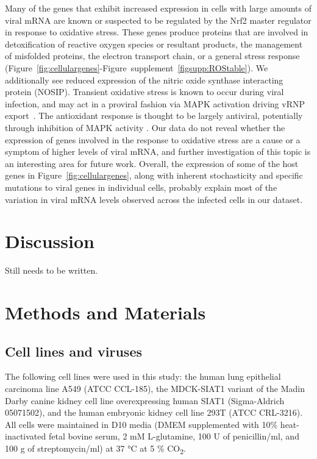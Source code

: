 \documentclass[9pt,lineno]{elife}
\begin{document}
Many of the genes that exhibit increased expression in cells with large amounts of viral mRNA are known or suspected to be regulated by the Nrf2 master regulator in response to oxidative stress.
These genes produce proteins that are involved in detoxification of reactive oxygen species or resultant products, the management of misfolded proteins, the electron transport chain, or a general stress response (Figure~\ref{fig:cellulargenes}-Figure~supplement~\ref{figsupp:ROStable}). 
We additionally see reduced expression of the nitric oxide synthase interacting protein (NOSIP). 
Transient oxidative stress is known to occur during viral infection, and may act in a proviral fashion via MAPK activation driving vRNP export~\citep{Amatore:2014cs}.
The antioxidant response is thought to be largely antiviral, potentially through inhibition of MAPK activity \citep{Lin:2016ec,Sgarbanti:2014ht}.
Our data do not reveal whether the expression of genes involved in the response to oxidative stress are a cause or a symptom of higher levels of viral mRNA, and further investigation of this topic is an interesting area for future work.
Overall, the expression of some of the host genes in Figure~\ref{fig:cellulargenes}, along with inherent stochasticity and specific mutations to viral genes in individual cells, probably explain most of the variation in viral mRNA levels observed across the infected cells in our dataset.

\section{Discussion}
Still needs to be written.

\section{Methods and Materials}

\subsection{Cell lines and viruses}
The following cell lines were used in this study: the human lung epithelial carcinoma line A549 (ATCC CCL-185), the MDCK-SIAT1 variant of the Madin Darby canine kidney cell line overexpressing human SIAT1 (Sigma-Aldrich 05071502), and the human embryonic kidney cell line 293T (ATCC CRL-3216). 
All cells were maintained in D10 media (DMEM supplemented with 10\% heat-inactivated fetal bovine serum, 2 mM L-glutamine, 100 U of penicillin/ml, and 100 \si{\micro}g of streptomycin/ml) at 37 \si{\degreeCelsius} at 5 \% CO\textsubscript{2}.
\end{document}
